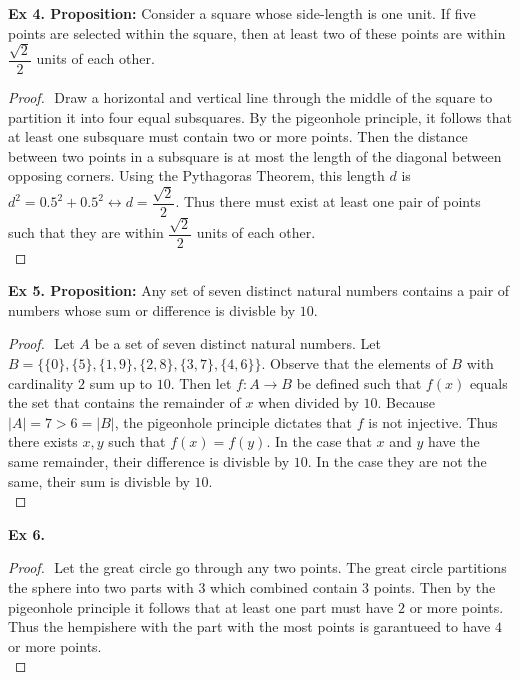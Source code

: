 \documentclass{article}
\begin{document}
\textbf{Ex 4. Proposition:} Consider a square whose side-length is one unit. If five points are selected within the square, then at least two of these points are within $\dfrac{\sqrt{2}}{2}$ units of each other.
\begin{proof}
$ $\newline
Draw a horizontal and vertical line through the middle of the square to partition it into four equal subsquares. By the pigeonhole principle, it follows that at least one subsquare must contain two or more points. Then the distance between two points in a subsquare is at most the length of the diagonal between opposing corners. Using the Pythagoras Theorem, this length $d$ is $d^2=0.5^2+0.5^2 \leftrightarrow d=\dfrac{\sqrt{2}}{2}$. Thus there must exist at least one pair of points such that they are within $\dfrac{\sqrt{2}}{2}$ units of each other.\\
\end{proof}

\textbf{Ex 5. Proposition:} Any set of seven distinct natural numbers contains a pair of numbers whose sum or difference is divisble by $10$.
\begin{proof}
$ $\newline
Let $A$ be a set of seven distinct natural numbers. Let $B=\{\{0\}, \{5\}, \{1, 9\}, \{2, 8\}, \{3, 7\}, \{4, 6\} \}$. Observe that the elements of $B$ with cardinality $2$ sum up to $10$. Then let $f: A \rightarrow B$ be defined such that $f(x)$ equals the set that contains the remainder of $x$ when divided by $10$. Because $|A|= 7 > 6 = |B|$, the pigeonhole principle dictates that $f$ is not injective. Thus there exists $x, y$ such that $f(x)=f(y)$. In the case that $x$ and $y$ have the same remainder, their difference is divisble by $10$. In the case they are not the same, their sum is divisble by $10$.\\
\end{proof}

\textbf{Ex 6.}
\begin{proof}
$ $\newline
Let the great circle go through any two points. The great circle partitions the sphere into two parts with $3$ which combined contain $3$ points. Then by the pigeonhole principle it follows that at least one part must have $2$ or more points. Thus the hempishere with the part with the most points is garantueed to have $4$ or more points.\\
\end{proof}
\end{document}
